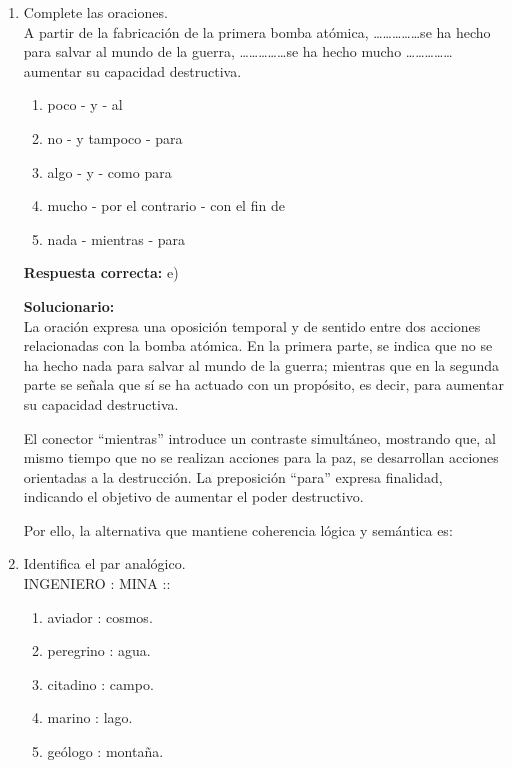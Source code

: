\begin{enumerate}
\vspace{6mm}

\item Complete las oraciones.\\
A partir de la fabricación de la primera bomba atómica, \dots\dots\dots\dots\dots se ha hecho para salvar al mundo de la guerra, \dots\dots\dots\dots\dots se ha hecho mucho \dots\dots\dots\dots\dots aumentar su capacidad destructiva.

\begin{enumerate}[label=\alph*)]
	\item poco - y - al
	\item no - y tampoco - para
	\item algo - y - como para
	\item mucho - por el contrario - con el fin de
	\item nada - mientras - para
\end{enumerate}

\textbf{Respuesta correcta:} e)

\vspace{2mm}
\textbf{Solucionario:}\\

La oración expresa una oposición temporal y de sentido entre dos acciones relacionadas con la bomba atómica.
En la primera parte, se indica que no se ha hecho nada para salvar al mundo de la guerra; mientras que en la segunda parte se señala que sí se ha actuado con un propósito, es decir, para aumentar su capacidad destructiva.

El conector “mientras” introduce un contraste simultáneo, mostrando que, al mismo tiempo que no se realizan acciones para la paz, se desarrollan acciones orientadas a la destrucción.
La preposición “para” expresa finalidad, indicando el objetivo de aumentar el poder destructivo.

Por ello, la alternativa que mantiene coherencia lógica y semántica es:

\vspace{6mm}

\item Identifica el par analógico.\\
INGENIERO : MINA ::

\begin{enumerate}[label=\alph*)]
	\item aviador : cosmos.
	\item peregrino : agua.
	\item citadino : campo.
	\item marino : lago.
	\item geólogo : montaña.
\end{enumerate}


\end{enumerate}
